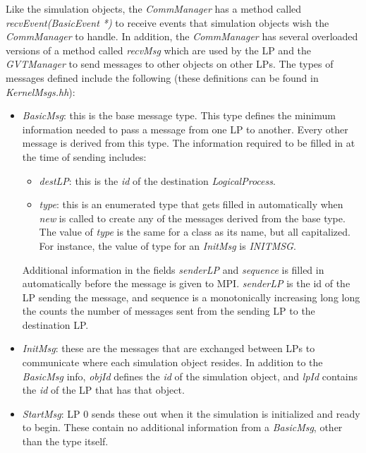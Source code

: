 \documentclass[11pt]{report}
\begin{document}
Like the simulation objects, the {\it CommManager} has a method called
{\it recvEvent(BasicEvent *)} to receive events that simulation objects
wish the {\it CommManager} to handle.  In addition, the {\it CommManager}
has several overloaded versions of a method called {\it recvMsg} which are
used by the LP and the {\it GVTManager} to send messages to other objects
on other LPs.  The types of messages defined include the following (these
definitions can be found in {\it KernelMsgs.hh}):

\begin{itemize}	

\item
{\it BasicMsg}: this is the base message type.  This type defines the
minimum information needed to pass a message from one LP to another.
Every other message is derived from this type.  The information required
to be filled in at the time of sending includes:

\begin{itemize}

\item
{\it destLP}: this is the {\it id} of the destination {\it 
LogicalProcess}.

\item
{\it type}: this is an enumerated type that gets filled in
automatically when {\it new} is called to create any of the messages
derived from the base type.  The value of {\it type} is the same for a
class as its name, but all capitalized.  For instance, the value of type
for an {\it InitMsg} is {\it INITMSG}.

\end{itemize}

Additional information in the fields {\it senderLP} and {\it sequence}
is filled in automatically before the message is given to MPI.  {\it 
senderLP} is the id of the LP sending the message, and sequence is a
monotonically increasing long long the counts the number of messages
sent from the sending LP to the destination LP.

\item
{\it InitMsg}: these are the messages that are exchanged between LPs to
communicate where each simulation object resides.  In addition to the
{\it BasicMsg} info, {\it objId} defines the {\it id} of the
simulation object, and {\it lpId} contains the {\it id} of the LP that
has that object.

\item
{\it StartMsg}: LP 0 sends these out when it the simulation is
initialized and ready to begin.  These contain no additional information
from a {\it BasicMsg}, other than the type itself.


\end{itemize}
\end{document}
